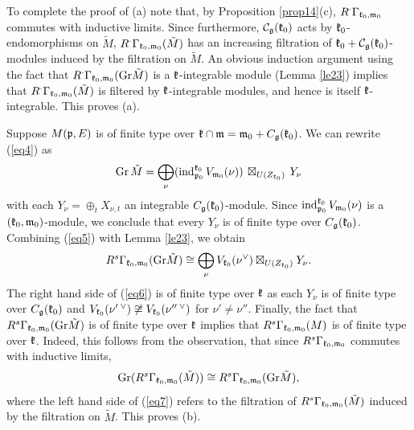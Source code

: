 \documentclass[12pt]{article}
\newcommand{\kk}{\mathfrak{k}}
\newcommand{\refle}[1]{Lemma \ref{#1}}
\newcommand{\refprop}[1]{Proposition \ref{#1}}
\newcommand{\refeq}[1]{(\ref{#1})}
\newcommand{\Gr}{\mathrm{Gr}}
\begin{document}
To complete the proof of (a) note that, by \refprop{prop14}(c), $R^\cdot\Gamma_{\frak k_{0},\frak m_{0}}$ commutes with inductive limits.  Since furthermore, $\mathcal{C}_{\frak g}(\frak k_0)$ acts by $\frak k_0$-endomorphisms on $\tilde M$, $R^\cdot\Gamma_{\frak k_{0},\frak m_{0}} (\tilde M)$ has an increasing filtration of $\frak k_0 + \mathcal{C}_{\frak g}(\frak k_0)$-modules induced by the filtration on $\tilde M$. An obvious induction argument using the fact that $R^\cdot\Gamma_{\frak k_{0},\frak m_{0}} (\Gr\tilde M)$ is a $\frak k$-integrable module (\refle{le23}) implies that $R^\cdot\Gamma_{\frak k_{0},\frak m_{0}} (\tilde M)$ is filtered by $\frak k$-integrable modules, and hence is itself $\frak k$-integrable.  This proves (a).

\item[(b)]  Suppose $M(\frak p, E)$ is of finite type over $\frak k\cap\frak m =  {\frak m}_0+ C_{\frak g} ({\frak k}_0)$. We can rewrite \refeq{eq4} as
$$
\Gr \, \tilde M = \bigoplus\limits_\nu  (\text{ind}^{\frak k_{0}}_{\frak p_{0}} \, V_{\frak m_{0}} (\nu)) \, \boxtimes_{U(Z_{\kk_0})} \, Y_\nu
$$
with each $Y_\nu = \oplus_t X_{\nu, t}$ an integrable $C_{\frak g}(\frak k_0)$-module.  Since $\text{ind}^{\frak k_{0}}_{\frak p_{0}} \, V_{\frak m_{0}} (\nu)$ is a $(\frak k_0,\frak m_0)$-module, we conclude that every $Y_\nu$ is of finite type over $C_{\frak g}(\frak k_0)$.  Combining \refeq{eq5} with \refle{le23}, we obtain
\begin{equation}\label{eq6}
R^s\Gamma_{\frak k_{0},\frak m_{0}} (\Gr \tilde M) \cong \bigoplus\limits_\nu V_{\frak k_{0}} (\nu^{\vee})\boxtimes_{U(Z_{\kk_0})} Y_\nu .
\end{equation}
The right hand side of \refeq{eq6} is of finite type over $\frak k$ as each $Y_\nu$ is of finite type over $C_{\frak g} (\frak k_0)$ and $V_{\frak k_{0}} (\nu'\,^{\vee}) \not\cong V_{\frak k_{0}} (\nu'' \,^{\vee})$ for $\nu'\neq \nu''$.  Finally, the fact that $R^s\Gamma_{\frak k_{0},\frak m_{0}} (\Gr \tilde M)$ is of finite type over $\frak k$ implies that $R^s \Gamma_{\frak k_{0},\frak m_{0}} (M)$ is of finite type over $\frak k$.  Indeed, this follows from the observation, that since $R^s \Gamma_{\frak k_{0},\frak m_{0}}$ commutes with inductive limits,
\begin{equation}\label{eq7}
\Gr (R^s\Gamma_{\frak k_{0},\frak m_{0}} (\tilde M)) \cong R^s \Gamma_{\frak k_{0},\frak m_{0}} (\Gr \tilde M),
\end{equation}
where the left hand side of \refeq{eq7} refers to the filtration of $R^s \Gamma_{\frak k_{0},\frak m_{0}}(\tilde M)$ induced by the filtration on $\tilde M$. This proves (b).
\end{document}
